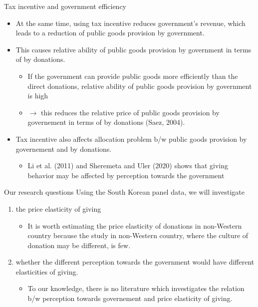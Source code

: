 \documentclass[
  ignorenonframetext,
]{beamer}
\providecommand{\tightlist}{%
  \setlength{\itemsep}{0pt}\setlength{\parskip}{0pt}}
\begin{document}
\begin{frame}{Tax incentive and government efficiency}
\protect\hypertarget{tax-incentive-and-government-efficiency}{}
\begin{itemize}
\tightlist
\item
  At the same time, using tax incentive reduces government's revenue, which leads to a reduction of public goods provision by government.
\item
  This causes relative ability of public goods provision by government in terms of by donations.

  \begin{itemize}
  \tightlist
  \item
    If the government can provide public goods more efficiently than the direct donations, relative ability of public goods provision by government is high
  \item
    \(\to\) this reduces the relative price of public goods provision by governement in terms of by donations (Saez, 2004).
  \end{itemize}
\item
  Tax incentive also affects allocation problem b/w public goods provision by governement and by donations.

  \begin{itemize}
  \tightlist
  \item
    Li et al. (2011) and Sheremeta and Uler (2020) shows that giving behavior may be affected by perception towards the government
  \end{itemize}
\end{itemize}
\end{frame}

\begin{frame}{Our research questions}
\protect\hypertarget{our-research-questions}{}
Using the South Korean panel data, we will investigate

\begin{enumerate}
\tightlist
\item
  the price elasticity of giving

  \begin{itemize}
  \tightlist
  \item
    It is worth estimating the price elasticity of donations in non-Western country because the study in non-Western country, where the culture of donation may be different, is few.
  \end{itemize}
\item
  whether the different perception towards the government would have different elasticities of giving.

  \begin{itemize}
  \tightlist
  \item
    To our knowledge, there is no literature which investigates the relation b/w perception towards governement and price elasticity of giving.
  \end{itemize}
\end{enumerate}
\end{frame}
\end{document}
